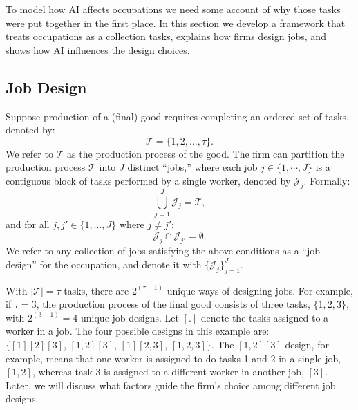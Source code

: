 \documentclass{article}
\theoremstyle{plain}
\theoremstyle{plain}
\begin{document}
To model how AI affects occupations we need some account of why those tasks were put together in the first place.
In this section we develop a framework that treats occupations as a collection tasks, explains how firms design jobs, and shows how AI influences the design choices.


\subsection{Job Design}
\label{sec:job_design}

Suppose production of a (final) good requires completing an ordered set of tasks, denoted by:
\begin{equation}
\label{eq:tasks}
\mathcal{T} = \{1,2,\ldots,\tau\}.
\end{equation}
We refer to $\mathcal{T}$ as the production process of the good.
The firm can partition the production process $\mathcal{T}$ into $J$ distinct ``jobs,'' where each job $j \in \{1, \cdots, J \}$ is a contiguous block of tasks performed by a single worker, denoted by $\mathcal{J}_j$.
Formally:
\[
\bigcup_{j=1}^J \mathcal{J}_j = \mathcal{T}, 
\]
and for all $j,j' \in \{1,\dots,J\}$ where $j \neq j'$:
\[
\mathcal{J}_j \cap \mathcal{J}_{j'} = \emptyset.
\]
We refer to any collection of jobs satisfying the above conditions as a ``job design'' for the occupation, and denote it with $\{\mathcal{J}_j\}_{j=1}^{J}$.

With $|\mathcal{T}| = \tau$ tasks, there are $2^{(\tau - 1)}$ unique ways of designing jobs.
For example, if $\tau = 3$, the production process of the final good consists of three tasks, $\{1,2,3\}$, with $2^{(3-1)}=4$ unique job designs.
Let $[.]$ denote the tasks assigned to a worker in a job.
The four possible designs in this example are: $\{[1][2][3], \, [1,2][3], \, [1][2,3], \, [1,2,3]\}$.
The $[1,2][3]$ design, for example, means that one worker is assigned to do tasks 1 and 2 in a single job, $[1,2]$, whereas task 3 is assigned to a different worker in another job, $[3]$.
Later, we will discuss what factors guide the firm’s choice among different job designs.
\end{document}
